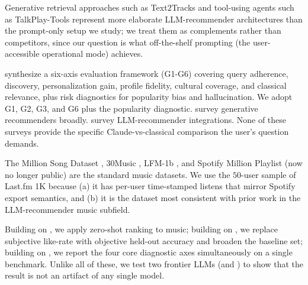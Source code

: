 Generative retrieval approaches such as Text$2$Tracks \citep{palumbo2025text2tracks} and tool-using agents such as TalkPlay-Tools \citep{doh2025talkplay} represent more elaborate LLM-recommender architectures than the prompt-only setup we study; we treat them as complements rather than competitors, since our question is what off-the-shelf prompting (the user-accessible operational mode) achieves.

 \citet{epure2025music} synthesize a six-axis evaluation framework (G1-G6) covering query adherence, discovery, personalization gain, profile fidelity, cultural coverage, and classical relevance, plus risk diagnostics for popularity bias \citep{abdollahpouri2019popularity} and hallucination. We adopt G1, G2, G3, and G6 plus the popularity diagnostic. \citet{deldjoo2024recommendation} survey generative recommenders broadly. \citet{lin2023how} survey LLM-recommender integrations. None of these surveys provide the specific Claude-vs-classical comparison the user's question demands.

 The Million Song Dataset \citep{bertin2011million}, $30$Music \citep{turrin201530music}, LFM-1b \citep{schedl2017lfm1b}, and Spotify Million Playlist (now no longer public) are the standard music datasets. We use the $50$-user sample of Last.fm 1K because (a) it has per-user time-stamped listens that mirror Spotify export semantics, and (b) it is the dataset most consistent with prior work in the LLM-recommender music subfield.

 Building on \citet{hou2024llm}, we apply zero-shot ranking to music; building on \citet{boadana2025llm}, we replace subjective like-rate with objective held-out accuracy and broaden the baseline set; building on \citet{epure2025music}, we report the four core diagnostic axes simultaneously on a single benchmark. Unlike all of these, we test two frontier LLMs (\claude and \gpt) to show that the result is not an artifact of any single model.
